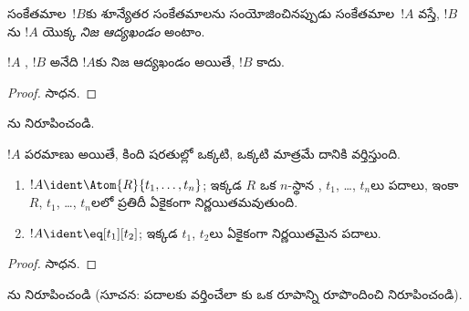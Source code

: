 \documentclass[../../../include/open-logic-section]{subfiles}
\begin{document}
\begin{defn}[నిజ ఆద్యఖండం]
సంకేతమాల~$!B$కు శూన్యేతర సంకేతమాలను సంయోజించినప్పుడు సంకేతమాల~$!A$
వస్తే, $!B$ను $!A$ యొక్క \emph{నిజ ఆద్యఖండం} అంటాం.
\end{defn}

\begin{lem}
$!A$ , $!B$ అనేది $!A$కు నిజ ఆద్యఖండం అయితే, $!B$
 కాదు.
\end{lem}

\begin{proof}
సాధన.
\end{proof}

\begin{prob}
ను నిరూపించండి.
\end{prob}

\begin{prop}
$!A$ పరమాణు  అయితే, కింది షరతుల్లో ఒక్కటి, ఒక్కటి మాత్రమే
దానికి వర్తిస్తుంది.
\begin{enumerate}
\item $!A \ident \Atom{R}{t_1,\dots,t_n}$; ఇక్కడ $R$ ఒక $n$-స్థాన
  , $t_1$, \dots, $t_n$లు పదాలు, ఇంకా $R$,
  $t_1$, \dots, $t_n$లలో ప్రతిదీ ఏకైకంగా నిర్ణయితమవుతుంది.
\item $!A \ident \eq[t_1][t_2]$; ఇక్కడ $t_1$, $t_2$లు ఏకైకంగా
  నిర్ణయితమైన పదాలు.
\end{enumerate}
\end{prop}

\begin{proof}
సాధన.
\end{proof}

\begin{prob}
ను నిరూపించండి (సూచన:
పదాలకు వర్తించేలా కు ఒక రూపాన్ని
రూపొందించి నిరూపించండి).
\end{prob}
\end{document}
